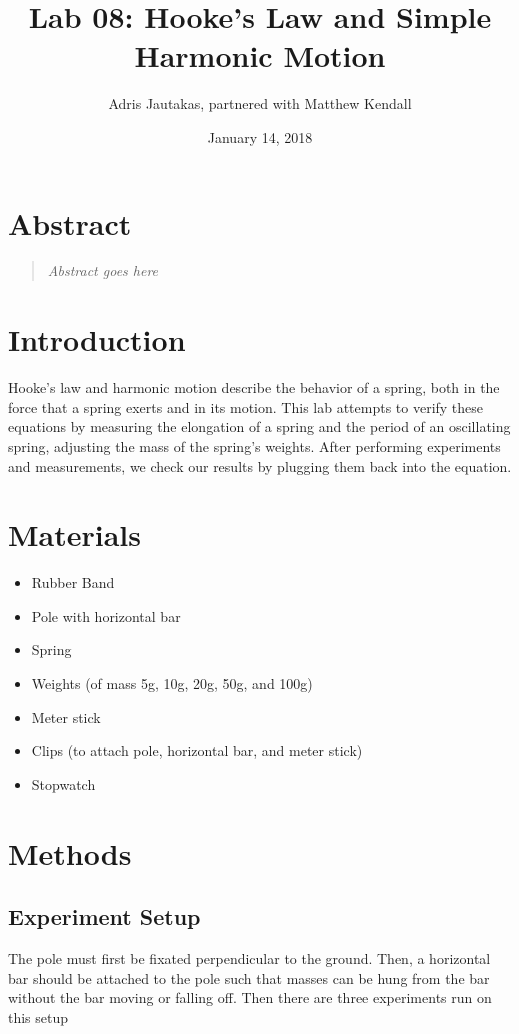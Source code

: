 \documentclass[12pt]{article}
\title{Lab 08: Hooke's Law and Simple Harmonic Motion}
\author{Adris Jautakas, partnered with Matthew Kendall}
\date{January 14, 2018}
\begin{document}
    \maketitle

    \pagebreak

    \section*{Abstract}
        \begin{quote}
        {\textit {\small 
            Abstract goes here
        } }
        \end{quote}

    \section{Introduction}
        Hooke's law and harmonic motion describe the behavior of a spring, both
        in the force that a spring exerts and in its motion. This lab attempts
        to verify these equations by measuring the elongation of a spring and
        the period of an oscillating spring, adjusting the mass of the spring's
        weights. After performing experiments and measurements, we check
        our results by plugging them back into the equation.

    \section{Materials}
        \begin{itemize}
            \item Rubber Band
            \item Pole with horizontal bar
            \item Spring
            \item Weights (of mass 5g, 10g, 20g, 50g, and 100g)
            \item Meter stick
            \item Clips (to attach pole, horizontal bar, and meter stick)
            \item Stopwatch
        \end{itemize}
    
    \section{Methods}
        \subsection{Experiment Setup}
            The pole must first be fixated perpendicular to the ground.
            Then, a horizontal bar should be attached to the pole such that
            masses can be hung from the bar without the bar moving or falling
            off. Then there are three experiments run on this setup
\end{document}
